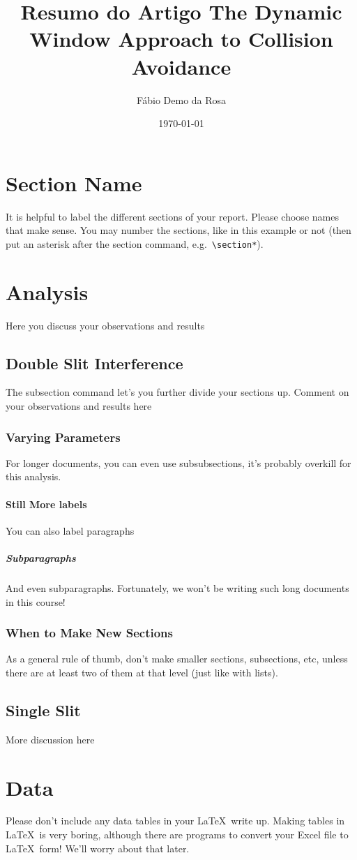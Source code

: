 \documentclass[12pt]{article}
\begin{document}
\title{Resumo do Artigo The Dynamic Window Approach to Collision Avoidance}
\author{Fábio Demo da Rosa}
\date{\today}

\maketitle

\section{Section Name}
	It is helpful to label the different sections of your report.
    Please choose names that make sense.  You may number the sections, like in this example or not (then put an asterisk after the section command, e.g.~\verb+\section*+). 
    
    
\section{Analysis}
	Here you discuss your observations and results
	
    \subsection{Double Slit Interference}
		The subsection command let's you further divide your sections up.  Comment on your observations and results here
        
        \subsubsection{Varying Parameters}
        	For longer documents, you can even use subsubsections, 
            it's probably overkill for this analysis.
            
            \paragraph{Still More labels}
            	You can also label paragraphs
                
                \subparagraph{Subparagraphs}
                	And even subparagraphs.  Fortunately, we won't be 
                    writing such long documents in this course!
       
       \subsubsection{When to Make New Sections}
        	As a general rule of thumb, don't make smaller sections, subsections, etc, unless there are at least two of them at that level (just like with lists).
	
    \subsection{Single Slit}
		More discussion here
        
\section{Data}
	Please don't include any data tables in your \LaTeX\, write up.  Making tables in \LaTeX\, is very boring, although there are programs to convert your Excel file to \LaTeX\, form!  We'll worry about that later.
\end{document}
